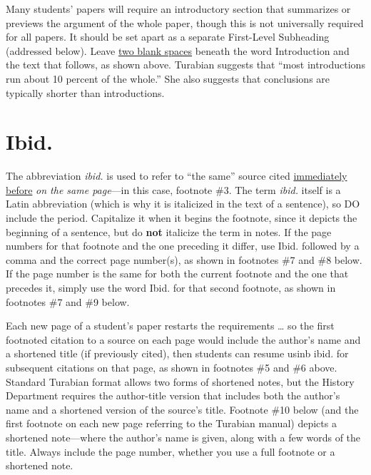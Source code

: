 \documentclass[raggedright]{turabian-researchpaper}
\begin{document}
Many students' papers will require an introductory section that summarizes or
previews the argument of the whole paper, though this is not universally
required for all papers.\autocite[390]{Turabian} It should be set apart as a
separate First-Level Subheading (addressed below). Leave \underline{two blank
spaces} beneath the word Introduction and the text that follows, as shown
above.\autocite[390]{Turabian} Turabian suggests that ``most introductions run
about 10 percent of the whole.''\autocite[104]{Turabian} She also suggests that
conclusions are typically shorter than introductions.

\section{Ibid.}

The abbreviation \textit{ibid.} is used to refer to ``the same'' source cited
\underline{immediately before} \emph{on the same
page}\autocite[161]{Turabian}---in this case, footnote \#3. The term
\textit{ibid.} itself is a Latin abbreviation (which is why it is italicized in
the text of a sentence), so DO include the period. Capitalize it when it begins
the footnote, since it depicts the beginning of a sentence, but do \textbf{not}
italicize the term in notes.\autocite[161]{Turabian} If the page numbers for
that footnote and the one preceding it differ, use Ibid. followed by a comma and
the correct page number(s), as shown in footnotes \#7 and \#8 below. If the page
number is the same for both the current footnote and the one that precedes it,
simply use the word Ibid. for that second footnote, as shown in footnotes \#7
and \#9 below.

Each new page of a student's paper restarts the requirements \dots{} so the
first footnoted citation to a source on each page would include the author's
name and a shortened title (if previously cited), then students can resume usinb
ibid. for subsequent citations on that page, as shown in footnotes \#5 and \#6
above. Standard Turabian format allows two forms of shortened
notes,\autocite[158-160]{Turabian} but the History Department requires the
author-title version that includes both the author's name and a shortened
version of the source's title. Footnote \#10 below (and the first footnote on
each new page referring to the Turabian manual) depicts a shortened note---where
the author's name is given, along with a few words of the title. Always include
the page number, whether you use a full footnote or a shortened note.
\end{document}
